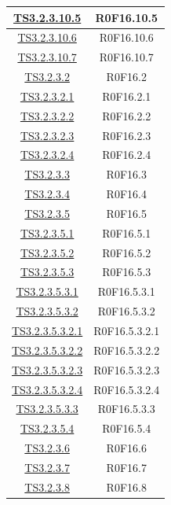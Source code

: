\documentclass[../PianoDiQualifica.tex]{subfiles}
\begin{document}
\begin{longtable}{|c|c|}
		\hyperlink{TS3.2.3.10.5}{TS3.2.3.10.5} & R0F16.10.5   \\
		\hline
		\hyperlink{TS3.2.3.10.6}{TS3.2.3.10.6} & R0F16.10.6   \\
		\hline
		\hyperlink{TS3.2.3.10.7}{TS3.2.3.10.7} & R0F16.10.7   \\
		\hline
		\hyperlink{TS3.2.3.2}{TS3.2.3.2} & R0F16.2   \\
		\hline
		\hyperlink{TS3.2.3.2.1}{TS3.2.3.2.1} & R0F16.2.1   \\
		\hline
		\hyperlink{TS3.2.3.2.2}{TS3.2.3.2.2} & R0F16.2.2   \\
		\hline
		\hyperlink{TS3.2.3.2.3}{TS3.2.3.2.3} & R0F16.2.3   \\
		\hline
		\hyperlink{TS3.2.3.2.4}{TS3.2.3.2.4} & R0F16.2.4   \\
		\hline
		\hyperlink{TS3.2.3.3}{TS3.2.3.3} & R0F16.3   \\
		\hline
		\hyperlink{TS3.2.3.4}{TS3.2.3.4} & R0F16.4   \\
		\hline
		\hyperlink{TS3.2.3.5}{TS3.2.3.5} & R0F16.5   \\
		\hline
		\hyperlink{TS3.2.3.5.1}{TS3.2.3.5.1} & R0F16.5.1   \\
		\hline
		\hyperlink{TS3.2.3.5.2}{TS3.2.3.5.2} & R0F16.5.2   \\
		\hline
		\hyperlink{TS3.2.3.5.3}{TS3.2.3.5.3} & R0F16.5.3   \\
		\hline
		\hyperlink{TS3.2.3.5.3.1}{TS3.2.3.5.3.1} & R0F16.5.3.1   \\
		\hline
		\hyperlink{TS3.2.3.5.3.2}{TS3.2.3.5.3.2} & R0F16.5.3.2   \\
		\hline
		\hyperlink{TS3.2.3.5.3.2.1}{TS3.2.3.5.3.2.1} & R0F16.5.3.2.1   \\
		\hline
		\hyperlink{TS3.2.3.5.3.2.2}{TS3.2.3.5.3.2.2} & R0F16.5.3.2.2   \\
		\hline
		\hyperlink{TS3.2.3.5.3.2.3}{TS3.2.3.5.3.2.3} & R0F16.5.3.2.3   \\
		\hline
		\hyperlink{TS3.2.3.5.3.2.4}{TS3.2.3.5.3.2.4} & R0F16.5.3.2.4   \\
		\hline
		\hyperlink{TS3.2.3.5.3.3}{TS3.2.3.5.3.3} & R0F16.5.3.3   \\
		\hline
		\hyperlink{TS3.2.3.5.4}{TS3.2.3.5.4} & R0F16.5.4   \\
		\hline
		\hyperlink{TS3.2.3.6}{TS3.2.3.6} & R0F16.6   \\
		\hline
		\hyperlink{TS3.2.3.7}{TS3.2.3.7} & R0F16.7   \\
		\hline
		\hyperlink{TS3.2.3.8}{TS3.2.3.8} & R0F16.8   \\

\end{longtable}
\end{document}

